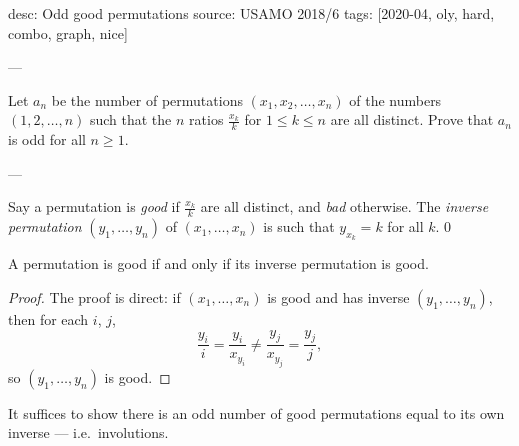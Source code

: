 desc: Odd good permutations
source: USAMO 2018/6
tags: [2020-04, oly, hard, combo, graph, nice]

---

Let $a_n$ be the number of permutations $(x_1,x_2,\ldots,x_n)$ of the numbers $(1,2,\ldots,n)$ such that the $n$ ratios $\frac{x_k}k$ for $1\le k\le n$ are all distinct. Prove that $a_n$ is odd for all $n\ge1$.

---

Say a permutation is \emph{good} if $\tfrac{x_k}k$ are all distinct, and \emph{bad} otherwise. The \emph{inverse permutation} $(y_1,\ldots,y_n)$ of $(x_1,\ldots,x_n)$ is such that $y_{x_k}=k$ for all $k$.
\setcounter{lemma}0
\begin{lemma}
    A permutation is good if and only if its inverse permutation is good.
\end{lemma}
\begin{proof}
    The proof is direct: if $(x_1,\ldots,x_n)$ is good and has inverse $(y_1,\ldots,y_n)$, then for each $i$, $j$, \[\frac{y_i}i=\frac{y_i}{x_{y_i}}\ne\frac{y_j}{x_{y_j}}=\frac{y_j}j,\]
    so $(y_1,\ldots,y_n)$ is good.
\end{proof}

It suffices to show there is an odd number of good permutations equal to its own inverse --- i.e.\ involutions.

